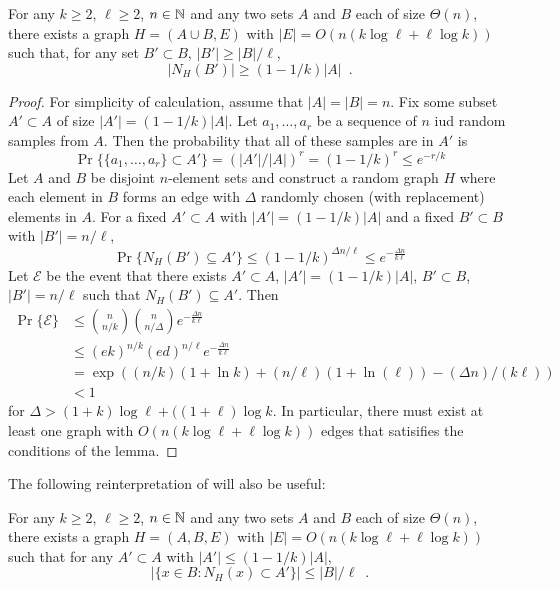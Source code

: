 \documentclass{patmorin}
\begin{document}
\begin{lem}
   For any $k\ge 2$, $\ell\ge 2$, $n\in\mathbb{N}$ and any two sets $A$ and $B$
   each of size $\Theta(n)$, there exists a graph $H=(A\cup B,E)$
   with $|E|=O(n(k\log \ell + \ell\log k))$ such that, for any set $B'\subset B$, $|B'|\ge |B|/\ell$, \[ |N_H(B')| \ge (1-1/k)|A| \enspace . \]
\end{lem}

\begin{proof}
  For simplicity of calculation, assume that $|A|=|B|=n$.  Fix some
  subset $A'\subset A$ of size $|A'|=(1-1/k)|A|$.  Let $a_1,\ldots,a_r$
  be a sequence of $n$ iud random samples from $A$.  Then the probability
  that all of these samples are in $A'$ is
  \[
     \Pr\{\{a_1,\ldots,a_r\}\subset A'\} = (|A'|/|A|)^r = (1-1/k)^r \le e^{-r/k}
  \]
  Let $A$ and $B$ be disjoint $n$-element sets and construct a random
  graph $H$ where each element in $B$ forms an edge with $\Delta$ randomly
  chosen (with replacement) elements in $A$.  For a fixed $A'\subset A$
  with $|A'|=(1-1/k)|A|$ and a fixed $B'\subset B$ with $|B'| = n/\ell$,
  \[
    \Pr\{N_H(B') \subseteq A'\} 
        \le (1-1/k)^{\Delta n/\ell} 
        \le e^{-\frac{\Delta n}{k\ell}}
  \]
  Let $\mathcal{E}$ be the event that there exists $A'\subset A$, $|A'|=(1-1/k)|A|$, $B'\subset B$, $|B'|=n/\ell$ such that $N_H(B')\subseteq A'$.  Then
  \begin{align*}
    \Pr\{\mathcal{E}\} 
        & \le \binom{n}{n/k}\binom{n}{n/\Delta}e^{-\frac{\Delta n}{k\ell}} \\
        & \le (ek)^{n/k} (ed)^{n/\ell}e^{-\frac{\Delta n}{k\ell}} \\
        & = \exp((n/k)(1+\ln k) + (n/\ell)(1+\ln(\ell)) - (\Delta n)/(k\ell)) \\
        & < 1
  \end{align*}
  for $\Delta > (1+k)\log \ell + ((1+\ell)\log k$.  In particular, there
  must exist at least one graph with $O(n(k\log\ell + \ell\log k))$
  edges that satisifies the conditions of the lemma.
\end{proof}

The following reinterpretation of  will also be useful:

\begin{cor}
   For any $k\ge 2$, $\ell\ge 2$, $n\in\mathbb{N}$ and any two sets $A$ and $B$
   each of size $\Theta(n)$, there exists a graph $H=(A,B,E)$
   with $|E|=O(n(k\log \ell + \ell\log k))$ such that
   for any $A'\subset A$ with $|A'|\le (1-1/k)|A|$, 
   \[ |\{x\in B : N_H(x)\subset A' \}| \le |B|/\ell \enspace .\]
\end{cor}
\end{document}
